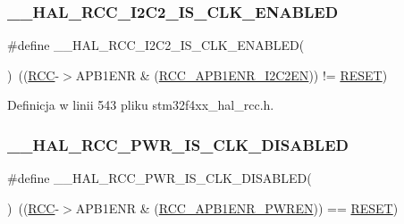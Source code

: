 \subsubsection{\texorpdfstring{\+\_\+\+\_\+\+H\+A\+L\+\_\+\+R\+C\+C\+\_\+\+I2\+C2\+\_\+\+I\+S\+\_\+\+C\+L\+K\+\_\+\+E\+N\+A\+B\+L\+ED}{\_\_HAL\_RCC\_I2C2\_IS\_CLK\_ENABLED}}
{\footnotesize\ttfamily \#define \+\_\+\+\_\+\+H\+A\+L\+\_\+\+R\+C\+C\+\_\+\+I2\+C2\+\_\+\+I\+S\+\_\+\+C\+L\+K\+\_\+\+E\+N\+A\+B\+L\+ED(\begin{DoxyParamCaption}{ }\end{DoxyParamCaption})~((\hyperlink{group___peripheral__declaration_ga74944438a086975793d26ae48d5882d4}{R\+CC}-\/$>$A\+P\+B1\+E\+NR \& (\hyperlink{group___peripheral___registers___bits___definition_gafd7d1c3c7dbe20aea87a694ae15840f6}{R\+C\+C\+\_\+\+A\+P\+B1\+E\+N\+R\+\_\+\+I2\+C2\+EN})) != \hyperlink{group___exported__types_gga89136caac2e14c55151f527ac02daaffa589b7d94a3d91d145720e2fed0eb3a05}{R\+E\+S\+ET})}



Definicja w linii 543 pliku stm32f4xx\+\_\+hal\+\_\+rcc.\+h.

\mbox{\label{group___r_c_c___a_p_b1___peripheral___clock___enable___disable___status_ga1019fdeb30eb4bcb23a0bea2278a94a2}} 
\subsubsection{\texorpdfstring{\+\_\+\+\_\+\+H\+A\+L\+\_\+\+R\+C\+C\+\_\+\+P\+W\+R\+\_\+\+I\+S\+\_\+\+C\+L\+K\+\_\+\+D\+I\+S\+A\+B\+L\+ED}{\_\_HAL\_RCC\_PWR\_IS\_CLK\_DISABLED}}
{\footnotesize\ttfamily \#define \+\_\+\+\_\+\+H\+A\+L\+\_\+\+R\+C\+C\+\_\+\+P\+W\+R\+\_\+\+I\+S\+\_\+\+C\+L\+K\+\_\+\+D\+I\+S\+A\+B\+L\+ED(\begin{DoxyParamCaption}{ }\end{DoxyParamCaption})~((\hyperlink{group___peripheral__declaration_ga74944438a086975793d26ae48d5882d4}{R\+CC}-\/$>$A\+P\+B1\+E\+NR \& (\hyperlink{group___peripheral___registers___bits___definition_ga5c19997ccd28464b80a7c3325da0ca60}{R\+C\+C\+\_\+\+A\+P\+B1\+E\+N\+R\+\_\+\+P\+W\+R\+EN})) == \hyperlink{group___exported__types_gga89136caac2e14c55151f527ac02daaffa589b7d94a3d91d145720e2fed0eb3a05}{R\+E\+S\+ET})}



